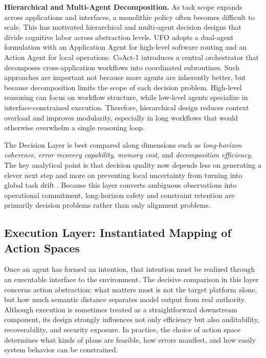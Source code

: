 \textbf{Hierarchical and Multi-Agent Decomposition.}  
As task scope expands across applications and interfaces, a monolithic policy often becomes difficult to scale. This has motivated hierarchical and multi-agent decision designs that divide cognitive labor across abstraction levels. UFO \cite{zhang2025ufo} adopts a dual-agent formulation with an Application Agent for high-level software routing and an Action Agent for local operations. CoAct-1 \cite{song2025coact} introduces a central orchestrator that decomposes cross-application workflows into coordinated subroutines. Such approaches are important not because more agents are inherently better, but because decomposition limits the scope of each decision problem. High-level reasoning can focus on workflow structure, while low-level agents specialize in interface-constrained execution. Therefore, hierarchical design reduces context overload and improves modularity, especially in long workflows that would otherwise overwhelm a single reasoning loop.

The Decision Layer is best compared along dimensions such as \emph{long-horizon coherence}, \emph{error recovery capability}, \emph{memory cost}, and \emph{decomposition efficiency}. The key analytical point is that decision quality now depends less on generating a clever next step and more on preventing local uncertainty from turning into global task drift \cite{wu2025guireflection,li2025mobileuse}. Because this layer converts ambiguous observations into operational commitment, long-horizon safety and constraint retention are primarily decision problems rather than only alignment problems.

\subsection{Execution Layer: Instantiated Mapping of Action Spaces}

Once an agent has formed an intention, that intention must be realized through an executable interface to the environment. The decisive comparison in this layer concerns action abstraction: what matters most is not the target platform alone, but how much semantic distance separates model output from real authority. Although execution is sometimes treated as a straightforward downstream component, its design strongly influences not only efficiency but also auditability, recoverability, and security exposure. In practice, the choice of action space determines what kinds of plans are feasible, how errors manifest, and how easily system behavior can be constrained.

